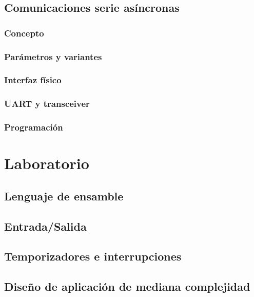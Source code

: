 \documentclass[a4paper]{book}
\begin{document}
\section{Comunicaciones serie asíncronas}
\subsection{Concepto}
\subsection{Parámetros y variantes}
\subsection{Interfaz físico}
\subsection{UART y transceiver}
\subsection{Programación}

\chapter{Laboratorio}
\section{Lenguaje de ensamble}
\section{Entrada/Salida}
\section{Temporizadores e interrupciones}
\section{Diseño de aplicación de mediana complejidad}


% 
\end{document}
